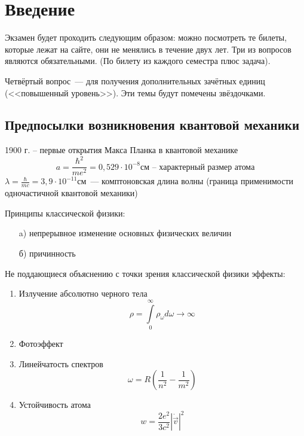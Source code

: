 \chapter{Введение}
\Rem Экзамен будет проходить следующим образом: можно посмотреть те билеты, которые лежат на сайте, они не менялись в течение двух лет. Три из вопросов являются обязательными. (По билету из каждого семестра плюс задача).

Четвёртый вопрос~--- для получения дополнительных зачётных единиц (<<повышенный уровень>>). Эти темы будут помечены звёздочками.

\section{Предпосылки возникновения квантовой механики}
1900 г. -- первые открытия Макса Планка в квантовой механике\\
$$
a = \frac{\hbar^{2}}{me^{2}}=0,529\cdot10^{-8} \text {см -- характерный размер атома}
$$
$
\lambda = \frac{\hbar}{mc} = 3,9\cdot10^{-11}$см~--- комптоновская длина волны (граница применимости одночастичной квантовой механики)

Принципы классической физики:
\begin{itemize}
\item[a)] непрерывное изменение основных физических величин
\item[б)] причинность
\end{itemize}
Не поддающиеся объяснению с точки зрения классической физики эффекты:\\
\begin{enumerate}
  \item Излучение абсолютно черного тела
$$
\rho = \int\limits_{0}^{\infty}\rho_{\omega} d\omega \rightarrow \infty
$$
  \item Фотоэффект
  \item Линейчатость спектров
$$
\omega  = R\left(\frac{1}{n^{2}}-\frac{1}{m^{2}}\right)
$$
  \item Устойчивость атома
$$
w = \frac{2e^{2}}{3c^{2}}|\dot{\vec{v}}|^{2}
$$
\end{enumerate}


